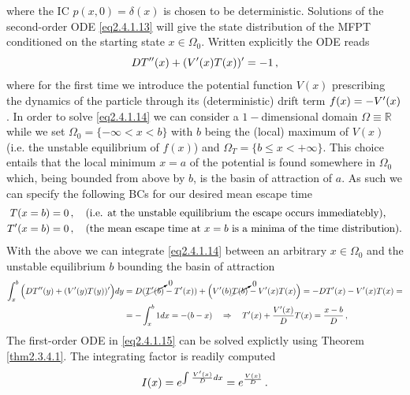 \documentclass[../main.tex]{subfiles}
\begin{document}
where the IC $p(x,0)=\delta(x)$ is chosen to be deterministic.
Solutions of the second-order ODE \eqref{eq2.4.1.13} will give the state distribution of the MFPT conditioned on the starting state $x\in\Omega_{0}$.
Written explicitly the ODE reads
\begin{equation}\label{eq2.4.1.14}
     D T''(x)+(V'(x)T(x))'=-1\,,
\end{equation}
where for the first time we introduce the potential function $V(x)$ prescribing the dynamics of the particle through its (deterministic) drift term $f(x)=-V'(x)$.
In order to solve \eqref{eq2.4.1.14} we can consider a $1-$dimensional domain $\Omega\equiv \mathbb{R}$ while we set $\Omega_{0}=\{-\infty<x<b\}$ with $b$ being the (local) maximum of $V(x)$ (i.e. the unstable equilibrium of $f(x)$) and $\Omega_{T}=\{b\leq x<+\infty\}$.
This choice entails that the local minimum $x=a$ of the potential is found somewhere in $\Omega_{0}$ which, being bounded from above by $b$, is the basin of attraction of $a$. 
As such we can specify the following BCs for our desired mean escape time
\begin{align*}
                   T(x=b)&=0\,,\quad \text{(i.e. at the unstable equilibrium the escape occurs immediatebly),}\\
        T'(x=b)&=0\,,\quad \text{(the mean escape time at $x=b$ is a minima of the time distribution).}\\
\end{align*}
With the above we can integrate \eqref{eq2.4.1.14} between an arbitrary $x\in\Omega_{0}$ and the unstable equilibrium $b$ bounding the basin of attraction
\begin{align}\label{eq2.4.1.15}
        \int_{x}^{b}\Big(D T''(y)+(V'(y)T(y))'\Big)dy &= D(\cancelto{0}{T'(b)}-T'(x))+\Big(V'(b)\cancelto{0}{T(b)}-V'(x)T(x)\Big) = -D T'(x)-V'(x)T(x) = \nonumber \\
                                                                                 &= -\int_{x}^{b}1dx = -(b-x) \quad\Rightarrow\quad T'(x)+\frac{V'(x)}{D}T(x)=\frac{x-b}{D}\,,
\end{align}
The first-order ODE in \eqref{eq2.4.1.15} can be solved explictly using Theorem \ref{thm2.3.4.1}.
The integrating factor is readily computed
\begin{equation*}
     I(x) = e^{\int_{}^{}\frac{V'(x)}{D}dx}=e^{\frac{V(x)}{D}}\,.
\end{equation*}
\end{document}
